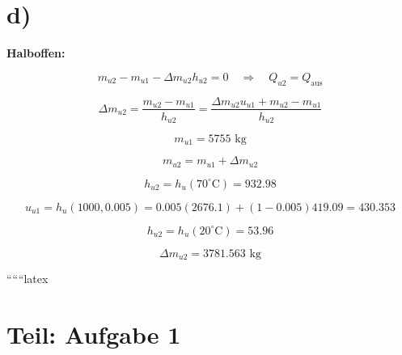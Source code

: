 

\section*{d)}

\textbf{Halboffen:}

\[
m_{u2} - m_{u1} - \Delta m_{u2} h_{u2} = 0 \quad \Rightarrow \quad Q_{u2} = Q_{\text{aus}}
\]

\[
\Delta m_{u2} = \frac{m_{u2} - m_{u1}}{h_{u2}} = \frac{\Delta m_{u2} u_{u1} + m_{u2} - m_{u1}}{h_{u2}}
\]

\[
m_{u1} = 5755 \text{ kg}
\]

\[
m_{u2} = m_{u1} + \Delta m_{u2}
\]

\[
h_{u2} = h_{u}(70^\circ \text{C}) = 932.98
\]

\[
u_{u1} = h_{u}(1000, 0.005) = 0.005 (2676.1) + (1 - 0.005) 419.09 = 430.353
\]

\[
h_{u2} = h_{u}(20^\circ \text{C}) = 53.96
\]

\[
\Delta m_{u2} = 3781.563 \text{ kg}
\]

``````latex


\section*{Teil: Aufgabe 1}